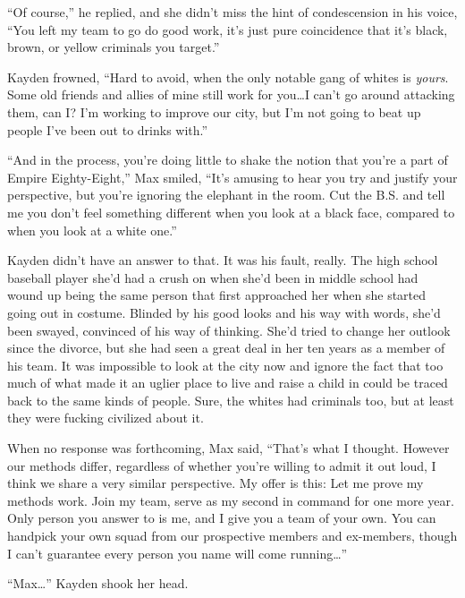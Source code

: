 ``Of course,'' he replied, and she didn't miss the hint of condescension in his voice, ``You left my team to go do good work, it's just pure coincidence that it's black, brown, or yellow criminals you target.''



Kayden frowned, ``Hard to avoid, when the only notable gang of whites is \emph{yours}.  Some old friends and allies of mine still work for you\ldots I can't go around attacking them, can I?  I'm working to improve our city, but I'm not going to beat up people I've been out to drinks with.''



``And in the process, you're doing little to shake the notion that you're a part of Empire Eighty-Eight,'' Max smiled, ``It's amusing to hear you try and justify your perspective, but you're ignoring the elephant in the room.  Cut the B.S. and tell me you don't feel something different when you look at a black face, compared to when you look at a white one.''



Kayden didn't have an answer to that.  It was his fault, really.  The high school baseball player she'd had a crush on when she'd been in middle school had wound up being the same person that first approached her when she started going out in costume.  Blinded by his good looks and his way with words, she'd been swayed, convinced of his way of thinking.  She'd tried to change her outlook since the divorce, but she had seen a great deal in her ten years as a member of his team.  It was impossible to look at the city now and ignore the fact that too much of what made it an uglier place to live and raise a child in could be traced back to the same kinds of people.  Sure, the whites had criminals too, but at least they were fucking civilized about it.



When no response was forthcoming, Max said, ``That's what I thought.  However our methods differ, regardless of whether you're willing to admit it out loud, I think we share a very similar perspective.  My offer is this:  Let me prove my methods work.  Join my team, serve as my second in command for one more year.  Only person you answer to is me, and I give you a team of your own.  You can handpick your own squad from our prospective members and ex-members, though I can't guarantee every person you name will come running\ldots''



``Max\ldots'' Kayden shook her head.



